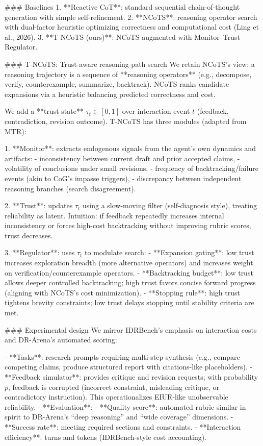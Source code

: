 ### Baselines  
1. **Reactive CoT**: standard sequential chain-of-thought generation with simple self-refinement.  
2. **NCoTS**: reasoning operator search with dual-factor heuristic optimizing correctness and computational cost (Ling et al., 2026).  
3. **T‑NCoTS (ours)**: NCoTS augmented with Monitor–Trust–Regulator.

### T‑NCoTS: Trust-aware reasoning-path search  
We retain NCoTS’s view: a reasoning trajectory is a sequence of **reasoning operators** (e.g., decompose, verify, counterexample, summarize, backtrack). NCoTS ranks candidate expansions via a heuristic balancing predicted correctness and cost.

We add a **trust state** \( \tau_t \in [0,1] \) over interaction event \(t\) (feedback, contradiction, revision outcome). T‑NCoTS has three modules (adapted from MTR):

1. **Monitor**: extracts endogenous signals from the agent’s own dynamics and artifacts:
   - inconsistency between current draft and prior accepted claims,
   - volatility of conclusions under small revisions,
   - frequency of backtracking/failure events (akin to CoG’s impasse triggers),
   - discrepancy between independent reasoning branches (search disagreement).

2. **Trust**: updates \( \tau_t \) using a slow-moving filter (self-diagnosis style), treating reliability as latent. Intuition: if feedback repeatedly increases internal inconsistency or forces high-cost backtracking without improving rubric scores, trust decreases.

3. **Regulator**: uses \( \tau_t \) to modulate search:
   - **Expansion gating**: low trust increases exploration breadth (more alternative operators) and increases weight on verification/counterexample operators.
   - **Backtracking budget**: low trust allows deeper controlled backtracking; high trust favors concise forward progress (aligning with NCoTS’s cost minimization).
   - **Stopping rule**: high trust tightens brevity constraints; low trust delays stopping until stability criteria are met.

### Experimental design  
We mirror IDRBench’s emphasis on interaction costs and DR-Arena’s automated scoring:

- **Tasks**: research prompts requiring multi-step synthesis (e.g., compare competing claims, produce structured report with citations-like placeholders).  
- **Feedback simulator**: provides critique and revision requests; with probability \(p\), feedback is corrupted (incorrect constraint, misleading critique, or contradictory instruction). This operationalizes EIUR-like unobservable reliability.  
- **Evaluation**:
  - **Quality score**: automated rubric similar in spirit to DR-Arena’s “deep reasoning” and “wide coverage” dimensions.  
  - **Success rate**: meeting required sections and constraints.  
  - **Interaction efficiency**: turns and tokens (IDRBench-style cost accounting).  

